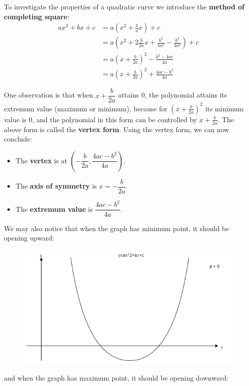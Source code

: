 \documentclass[12pt]{article}
\begin{document}
    To investigate the properties of a quadratic curve we introduce the \textbf{method of completing square}:\begin{align*}
        ax^2+bx+c&=a(x^2+\frac{b}{a}x)+c\\
        &=a(x^2+2\frac{b}{2a}x+\frac{b^2}{4a^2}-\frac{b^2}{4a^2})+c\\
        &=a(x+\frac{b}{2a})^2-\frac{b^2-4ac}{4a}\\
        &=a(x+\frac{b}{2a})^2+\frac{4ac-b^2}{4a}
    \end{align*}

    One observation is that when $x+\dfrac{b}{2a}$ attains 0, the polynomial attains its extremum value (maximum or minimum), because for $(x+\frac{b}{2a})^2$ its minimum value is 0, and the polynomial in this form can be controlled by $x+\frac{b}{2a}$. The above form is called the \textbf{vertex form}. Using the vertex form, we can now conclude: \begin{itemize}
        \item The \textbf{vertex} is at $(-\dfrac{b}{2a},\dfrac{4ac-b^2}{4a})$.
        \item The \textbf{axis of symmetry} is $x=-\dfrac{b}{2a}$.
        \item The \textbf{extremum value} is $\dfrac{4ac-b^2}{4a}$.
    \end{itemize}

    We may also notice that when the graph has minimum point, it should be opening upward:

    \begin{figure}[H]
        \centering
        \includegraphics[scale=0.6]{open_upward.png}
    \end{figure}

    and when the graph has maximum point, it should be opening downward:
\end{document}
